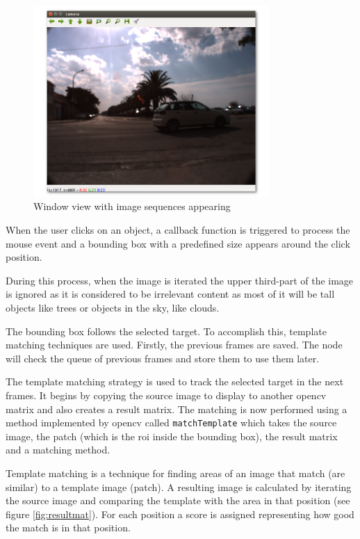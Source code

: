 \begin{figure}[htp]
	
	\centering
	\includegraphics[width=0.8\textwidth]{caplabel/imgs/view.png}
	
	\caption{Window view with image sequences appearing}
	\label{fig:view}
	
\end{figure}

When the user clicks on an object, a callback function is triggered to process the mouse event and a bounding box with a predefined size appears around the click position.

During this process, when the image is iterated the upper third-part of the image is ignored as it is considered to be irrelevant content as most of it will be tall objects like trees or objects in the sky, like clouds.

The bounding box follows the selected target. To accomplish this, template matching techniques are used. Firstly, the previous frames are saved. The node will check the queue of previous frames and store them to use them later. 

The template matching strategy is used to track the selected target in the next frames. It begins by copying the source image to display to another \gls{opencv} matrix and also creates a result matrix. The matching is now performed using a method implemented by \gls{opencv} called \texttt{matchTemplate} which takes the source image, the patch (which is the \gls{roi} inside the bounding box), the result matrix and a matching method. 

Template matching is a technique for finding areas of an image that match (are similar) to a template image (patch). A resulting image is calculated by iterating the source image and comparing the template with the area in that position (see figure \ref{fig:resultmat}). For each position a score is assigned representing how good the match is in that position.


